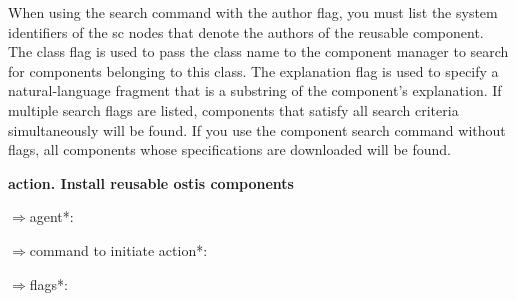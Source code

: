 \documentclass[twocolumn]{article}
\begin{document}
\hfill\break
\begin{d}
\quad When using the search command with the author flag,
you must list the system identifiers of the sc nodes that
denote the authors of the reusable component. The class
flag is used to pass the class name to the component
manager to search for components belonging to this class.
The explanation flag is used to specify a natural-language
fragment that is a substring of the component’s explanation. If multiple search flags are listed, components that
satisfy all search criteria simultaneously will be found. If
you use the component search command without flags, all
components whose specifications are downloaded will be
found.
\end{d}
\hfill\break
\hfill\break
\textbf{action. Install reusable ostis components}



$\Rightarrow $\quad agent*: \hfill\break
\begin{d}
\quad\quad [ScComponentManagerInstallAgent]\hfill\break 
\end{d}
$\Rightarrow $\quad command to initiate action*: \hfill\break
\begin{d}
\quad{}
\end{d}

$\Rightarrow $\quad flags*: 
\end{document}
